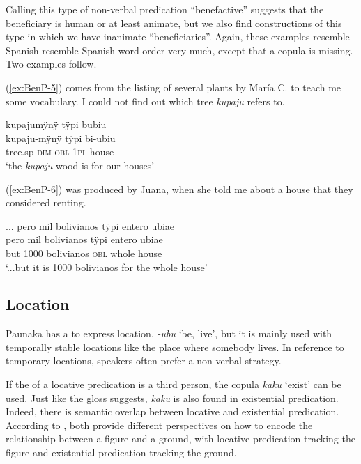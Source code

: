 Calling this type of non-verbal predication “benefactive” suggests that the beneficiary is human or at least animate, but we also find constructions of this type in which we have inanimate “beneficiaries”. Again, these examples resemble Spanish resemble Spanish word order very much, except that a copula is missing. Two examples follow.

(\ref{ex:BenP-5}) comes from the listing of several plants by María C. to teach me some vocabulary. I could not find out which tree \textit{kupaju} refers to.

\ea\label{ex:BenP-5}
\begingl
\glpreamble kupajumÿnÿ tÿpi bubiu\\
\gla kupaju-mÿnÿ tÿpi bi-ubiu\\
\glb tree.sp-\textsc{dim} \textsc{obl} 1\textsc{pl}-house\\
\glft ‘the \textit{kupaju} wood is for our houses’
\endgl
\trailingcitation{[uxx-p110825l.229]}
\xe

(\ref{ex:BenP-6}) was produced by Juana, when she told me about a house that they considered renting.

\ea\label{ex:BenP-6}
\begingl
\glpreamble ... pero mil bolivianos tÿpi entero ubiae\\
\gla pero mil bolivianos tÿpi entero ubiae\\
\glb but 1000 bolivianos \textsc{obl} whole house\\
\glft ‘...but it is 1000 bolivianos for the whole house’
\endgl
\trailingcitation{[jxx-p120430l-1.365-369]}
\xe


\subsection{Location}\label{sec:LocativePredicates}

Paunaka has a  to express location, \textit{-ubu} ‘be, live’, but it is mainly used with temporally stable locations like the place where somebody lives. In reference to temporary locations, speakers often prefer a non-verbal strategy. 

If the  of a locative predication is a third person, the copula \textit{kaku} ‘exist’ can be used. Just like the gloss suggests, \textit{kaku} is also found in existential predication. Indeed, there is semantic overlap between locative and existential predication. According to \citet[9]{Creissels2014a}, both provide different perspectives on how to encode the relationship between a figure and a ground, with locative predication tracking the figure and existential predication tracking the ground. 

